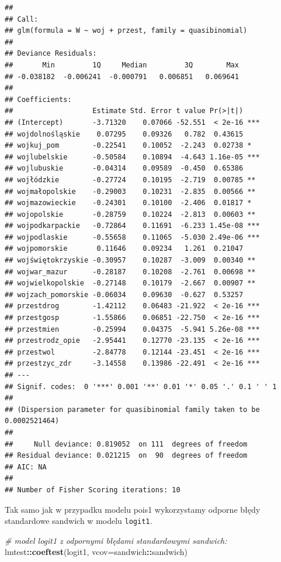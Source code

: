 \documentclass[polish,]{book}
\newenvironment{Shaded}{\begin{snugshade}}{\end{snugshade}}
\newcommand{\CommentTok}[1]{\textcolor[rgb]{0.56,0.35,0.01}{\textit{#1}}}
\newcommand{\DataTypeTok}[1]{\textcolor[rgb]{0.13,0.29,0.53}{#1}}
\newcommand{\KeywordTok}[1]{\textcolor[rgb]{0.13,0.29,0.53}{\textbf{#1}}}
\newcommand{\NormalTok}[1]{#1}
\newcommand{\OperatorTok}[1]{\textcolor[rgb]{0.81,0.36,0.00}{\textbf{#1}}}
\begin{document}
\begin{verbatim}
## 
## Call:
## glm(formula = W ~ woj + przest, family = quasibinomial)
## 
## Deviance Residuals: 
##       Min         1Q     Median         3Q        Max  
## -0.038182  -0.006241  -0.000791   0.006851   0.069641  
## 
## Coefficients:
##                   Estimate Std. Error t value Pr(>|t|)    
## (Intercept)       -3.71320    0.07066 -52.551  < 2e-16 ***
## wojdolnośląskie    0.07295    0.09326   0.782  0.43615    
## wojkuj_pom        -0.22541    0.10052  -2.243  0.02738 *  
## wojlubelskie      -0.50584    0.10894  -4.643 1.16e-05 ***
## wojlubuskie       -0.04314    0.09589  -0.450  0.65386    
## wojłódzkie        -0.27724    0.10195  -2.719  0.00785 ** 
## wojmałopolskie    -0.29003    0.10231  -2.835  0.00566 ** 
## wojmazowieckie    -0.24301    0.10100  -2.406  0.01817 *  
## wojopolskie       -0.28759    0.10224  -2.813  0.00603 ** 
## wojpodkarpackie   -0.72864    0.11691  -6.233 1.45e-08 ***
## wojpodlaskie      -0.55658    0.11065  -5.030 2.49e-06 ***
## wojpomorskie       0.11646    0.09234   1.261  0.21047    
## wojświętokrzyskie -0.30957    0.10287  -3.009  0.00340 ** 
## wojwar_mazur      -0.28187    0.10208  -2.761  0.00698 ** 
## wojwielkopolskie  -0.27148    0.10179  -2.667  0.00907 ** 
## wojzach_pomorskie -0.06034    0.09630  -0.627  0.53257    
## przestdrog        -1.42112    0.06483 -21.922  < 2e-16 ***
## przestgosp        -1.55866    0.06851 -22.750  < 2e-16 ***
## przestmien        -0.25994    0.04375  -5.941 5.26e-08 ***
## przestrodz_opie   -2.95441    0.12770 -23.135  < 2e-16 ***
## przestwol         -2.84778    0.12144 -23.451  < 2e-16 ***
## przestzyc_zdr     -3.14558    0.13986 -22.491  < 2e-16 ***
## ---
## Signif. codes:  0 '***' 0.001 '**' 0.01 '*' 0.05 '.' 0.1 ' ' 1
## 
## (Dispersion parameter for quasibinomial family taken to be 0.0002521464)
## 
##     Null deviance: 0.819052  on 111  degrees of freedom
## Residual deviance: 0.021215  on  90  degrees of freedom
## AIC: NA
## 
## Number of Fisher Scoring iterations: 10
\end{verbatim}

Tak samo jak w przypadku modelu pois1 wykorzystamy odporne błędy standardowe
sandwich w modelu \texttt{logit1}.

\begin{Shaded}
\begin{Highlighting}[]
\CommentTok{# model logit1 z odpornymi błędami standardowymi sandwich:}
\NormalTok{lmtest}\OperatorTok{::}\KeywordTok{coeftest}\NormalTok{(logit1, }\DataTypeTok{vcov=}\NormalTok{sandwich}\OperatorTok{::}\NormalTok{sandwich)}
\end{Highlighting}
\end{Shaded}
\end{document}
